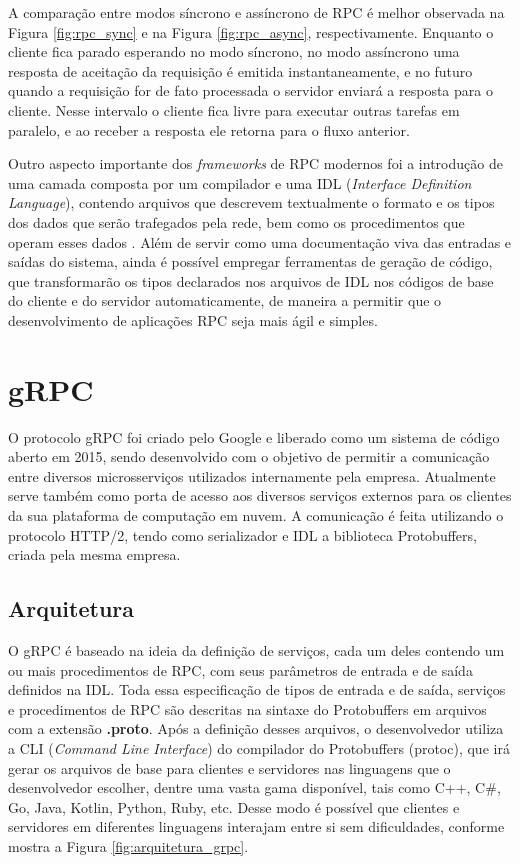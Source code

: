 A comparação entre modos síncrono e assíncrono de RPC é melhor observada na Figura \ref{fig:rpc_sync} e na Figura \ref{fig:rpc_async}, respectivamente. Enquanto o cliente fica parado esperando no modo síncrono, no modo assíncrono uma resposta de aceitação da requisição é emitida instantaneamente, e no futuro quando a requisição for de fato processada o servidor enviará a resposta para o cliente. Nesse intervalo o cliente fica livre para executar outras tarefas em paralelo, e ao receber a resposta ele retorna para o fluxo anterior.

Outro aspecto importante dos \textit{frameworks} de RPC modernos foi a introdução de uma camada composta por um compilador e uma IDL (\textit{Interface Definition Language}), contendo arquivos que descrevem textualmente o formato e os tipos dos dados que serão trafegados pela rede, bem como os procedimentos que operam esses dados \cite{slee_thrift_nodate}. Além de servir como uma documentação viva das entradas e saídas do sistema, ainda é possível empregar ferramentas de geração de código, que transformarão os tipos declarados nos arquivos de IDL nos códigos de base do cliente e do servidor automaticamente, de maneira a permitir que o desenvolvimento de aplicações RPC seja mais ágil e simples.

\section{gRPC}

O protocolo gRPC foi criado pelo Google e liberado como um sistema de código aberto em 2015, sendo desenvolvido com o objetivo de permitir a comunicação entre diversos microsserviços utilizados internamente pela empresa. Atualmente serve também como porta de acesso aos diversos serviços externos para os clientes da sua plataforma de computação em nuvem. A comunicação é feita utilizando o protocolo HTTP/2, tendo como serializador e IDL a biblioteca Protobuffers, criada pela mesma empresa.

\subsection{Arquitetura}

O gRPC \cite{google_grpc_2015} é baseado na ideia da definição de serviços, cada um deles contendo um ou mais procedimentos de RPC, com seus parâmetros de entrada e de saída definidos na IDL. Toda essa especificação de tipos de entrada e de saída, serviços e procedimentos de RPC são descritas na sintaxe do Protobuffers em arquivos com a extensão \textbf{.proto}. Após a definição desses arquivos, o desenvolvedor utiliza a CLI (\textit{Command Line Interface}) do compilador do Protobuffers (protoc), que irá gerar os arquivos de base para clientes e servidores nas linguagens que o desenvolvedor escolher, dentre uma vasta gama disponível, tais como C++, C\#, Go, Java, Kotlin, Python, Ruby, etc. Desse modo é possível que clientes e servidores em diferentes linguagens interajam entre si sem dificuldades, conforme mostra a Figura \ref{fig:arquitetura_grpc}.

